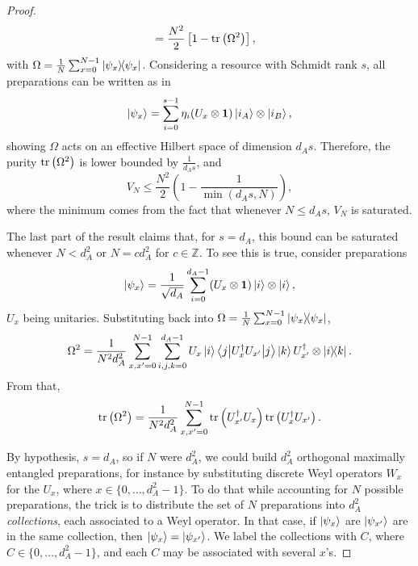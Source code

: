 \begin{proof}
\begin{align*}
            &= \frac{N^2}{2} \left[ 1 - \text{tr}\left( \Omega^2 \right) \right] ,
        \end{align*}
        with $\Omega = \frac{1}{N} \sum_{x=0}^{N-1} \ketbra{\psi_x}{\psi_x}$. Considering a resource with Schmidt rank $s$, all preparations can be written as in
        $$
            \ket{\psi_x} = \sum_{i = 0}^{s - 1} \eta_i (U_x \otimes \mathbf{1}) \ket{i_A} \otimes \ket{i_B} ,
        $$
        showing $\Omega$ acts on an effective Hilbert space of dimension $d_A s$. Therefore, the purity $\text{tr}\left( \Omega^2 \right)$ is lower bounded by $\frac{1}{d_A s}$, and
        $$
            V_N \leq \frac{N^2}{2} \left( 1 - \frac{1}{\min(d_A s, N)} \right) ,
        $$
		where the minimum comes from the fact that whenever $N \leq d_A s$, $V_N$ is saturated.

        The last part of the result claims that, for $s=d_A$, this bound can be saturated whenever $N < d_A^2$ or $N = c d_A^2$ for $c \in \mathbb{Z}$. To see this is true, consider preparations
        $$
            \ket{\psi_x} = \frac{1}{\sqrt{d_A}} \sum_{i=0}^{d_A - 1} (U_x \otimes \mathbf{1}) \ket{i} \otimes \ket{i} ,
        $$
        $U_x$ being unitaries. Substituting back into $\Omega = \frac{1}{N} \sum_{x=0}^{N-1} \ketbra{\psi_x}{\psi_x}$,
        $$
            \Omega^2 = \frac{1}{N^2 d_A^2} \sum_{x, x^\prime = 0}^{N - 1} \sum_{i, j, k = 0}^{d_A - 1} U_x \ket{i} \left\langle j \middle\vert U_x^\dagger U_{x^\prime} \middle\vert j \right\rangle \ket{k} U_{x^\prime}^\dagger \otimes \ketbra{i}{k} .
        $$
        From that,
        $$
            \text{tr}\left( \Omega^2 \right) = \frac{1}{N^2 d_A^2} \sum_{x, x^\prime = 0}^{N-1} \text{tr}\left( U_{x^\prime}^\dagger U_x \right) \text{tr}\left( U_{x}^\dagger U_{x^\prime} \right) .
        $$

        By hypothesis, $s=d_A$, so if $N$ were $d_A^2$, we could build $d_A^2$ orthogonal maximally entangled preparations, for instance by substituting discrete Weyl operators $W_x$ for the $U_x$, where $x \in \{0, \ldots, d_A^2 - 1 \}$. To do that while accounting for $N$ possible preparations, the trick is to distribute the set of $N$ preparations into $d_A^2$ \emph{collections}, each associated to a Weyl operator. In that case, if $\ket{\psi_x}$ are $\ket{\psi_{x^\prime}}$ are in the same collection, then $\ket{\psi_x} = \ket{\psi_{x^\prime}}$. We label the collections with $C$, where $C \in \{0, \ldots, d_A^2 -1 \}$, and each $C$ may be associated with several $x$'s.
        

\end{proof}
